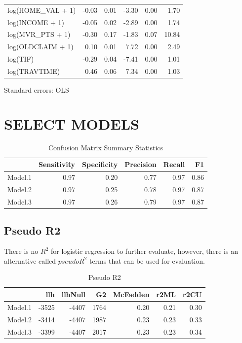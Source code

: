 \documentclass[]{article}
\begin{document}
\begin{table}[!h]
\begin{threeparttable}
\begin{tabular}{lrrrrr}
log(HOME\_VAL + 1) & -0.03 & 0.01 & -3.30 & 0.00 & 1.70\\
\rowcolor{gray!6}  log(INCOME + 1) & -0.05 & 0.02 & -2.89 & 0.00 & 1.74\\
\addlinespace
log(MVR\_PTS + 1) & -0.30 & 0.17 & -1.83 & 0.07 & 10.84\\
\rowcolor{gray!6}  log(OLDCLAIM + 1) & 0.10 & 0.01 & 7.72 & 0.00 & 2.49\\
log(TIF) & -0.29 & 0.04 & -7.41 & 0.00 & 1.01\\
\rowcolor{gray!6}  log(TRAVTIME) & 0.46 & 0.06 & 7.34 & 0.00 & 1.03\\
\bottomrule
\end{tabular}
\begin{tablenotes}
\item Standard errors: OLS
\end{tablenotes}
\end{threeparttable}
\end{table}

\newpage

\section{SELECT MODELS}\label{select-models}

\begin{table}

\caption{\label{tab:t14}Confusion Matrix Summary Statistics}
\centering
\begin{tabular}[t]{l|r|r|r|r|r}
\hline
  & Sensitivity & Specificity & Precision & Recall & F1\\
\hline
Model.1 & 0.97 & 0.20 & 0.77 & 0.97 & 0.86\\
\hline
Model.2 & 0.97 & 0.25 & 0.78 & 0.97 & 0.87\\
\hline
Model.3 & 0.97 & 0.26 & 0.79 & 0.97 & 0.87\\
\hline
\end{tabular}
\end{table}

\subsection{Pseudo R2}\label{pseudo-r2}

There is no \(R^2\) for logistic regression to further evaluate,
however, there is an alternative called \(pseudo R^2\) terms that can be
used for evaluation.

\begin{table}

\caption{\label{tab:t15}Pseudo R2}
\centering
\begin{tabular}[t]{l|r|r|r|r|r|r}
\hline
  & llh & llhNull & G2 & McFadden & r2ML & r2CU\\
\hline
Model.1 & -3525 & -4407 & 1764 & 0.20 & 0.21 & 0.30\\
\hline
Model.2 & -3414 & -4407 & 1987 & 0.23 & 0.23 & 0.33\\
\hline
Model.3 & -3399 & -4407 & 2017 & 0.23 & 0.23 & 0.34\\
\hline
\end{tabular}
\end{table}
\end{document}
